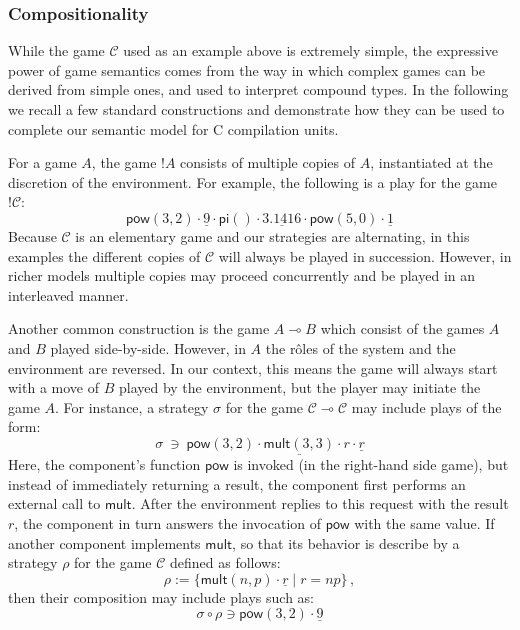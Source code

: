 \documentclass[acmsmall,timestamp,review]{acmart}
\newcommand{\kw}[1]{\ensuremath{ \mathsf{#1} }}
\begin{document}

\subsubsection{Compositionality} %

While the game $\mathcal{C}$ used as an example above
is extremely simple,
the expressive power of game semantics
comes from the way in which complex games can be derived from simple ones,
and used to interpret compound types.
In the following we recall a few standard constructions
and demonstrate how they can be used
to complete our semantic model for C compilation units.

For a game $A$,
the game $!A$ consists of multiple copies of $A$,
instantiated at the discretion of the environment.
For example,
the following is a play for the game $!\mathcal{C}$:
\[
    \kw{pow}(3,2) \cdot
    \underline{9} \cdot
    \kw{pi}() \cdot
    \underline{3.1416} \cdot
    \kw{pow}(5,0) \cdot
    \underline{1}
\]
Because $\mathcal{C}$ is an elementary game
and our strategies are alternating,
in this examples the different copies of $\mathcal{C}$
will always be played in succession.
However,
in richer models multiple copies may proceed
concurrently
and be played in an interleaved manner.

Another common construction is the game $A \multimap B$
which consist of the games $A$ and $B$ played side-by-side.
However, in $A$ the r\^oles of the system and the environment
are reversed.
In our context,
this means the game will always start
with a move of $B$ played by the environment,
but the player may initiate the game $A$.
For instance, a strategy $\sigma$
for the game $\mathcal{C} \multimap \mathcal{C}$
may include plays of the form:
\[
    \sigma \: \ni \:
    \kw{pow}(3,2) \cdot
    \underline{\kw{mult}(3,3)} \cdot
    r \cdot
    \underline{r}
\]
Here,
the component's function $\kw{pow}$
is invoked (in the right-hand side game),
but instead of immediately returning a result,
the component first performs an external call to $\kw{mult}$.
After the environment replies to this request with the result $r$,
the component in turn answers the invocation of $\kw{pow}$
with the same value.
If another component implements $\kw{mult}$,
so that its behavior is describe by a strategy $\rho$
for the game $\mathcal{C}$ defined as follows:
\[ \rho := \{ \kw{mult}(n,p) \cdot \underline{r} \mid r = n p \} \,, \]
then their composition may include plays such as:
\[ \sigma \circ \rho \ni \kw{pow}(3,2) \cdot \underline{9} \]
\end{document}
